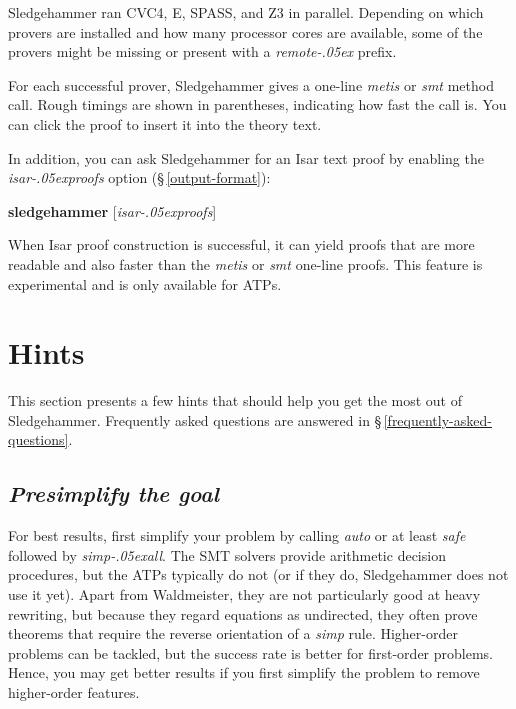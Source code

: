 \documentclass[a4paper,12pt]{article}
\let\oldS=\S
\def\S{\oldS\,}
\renewcommand\_{\hbox{\textunderscore\kern-.05ex}}
\begin{document}
Sledgehammer ran CVC4, E, SPASS, and Z3 in parallel. Depending on which
provers are installed and how many processor cores are available, some of the
provers might be missing or present with a \textit{remote\_} prefix.

For each successful prover, Sledgehammer gives a one-line \textit{metis} or
\textit{smt} method call. Rough timings are shown in parentheses, indicating how
fast the call is. You can click the proof to insert it into the theory text.

In addition, you can ask Sledgehammer for an Isar text proof by enabling the
\textit{isar\_proofs} option (\S\ref{output-format}):

\prew
\textbf{sledgehammer} [\textit{isar\_proofs}]
\postw

When Isar proof construction is successful, it can yield proofs that are more
readable and also faster than the \textit{metis} or \textit{smt} one-line
proofs. This feature is experimental and is only available for ATPs.


\section{Hints}
\label{hints}

This section presents a few hints that should help you get the most out of
Sledgehammer. Frequently asked questions are answered in
\S\ref{frequently-asked-questions}.

\newcommand\point[1]{\subsection{\emph{#1}}}


\point{Presimplify the goal}

For best results, first simplify your problem by calling \textit{auto} or at
least \textit{safe} followed by \textit{simp\_all}. The SMT solvers provide
arithmetic decision procedures, but the ATPs typically do not (or if they do,
Sledgehammer does not use it yet). Apart from Waldmeister, they are not
particularly good at heavy rewriting, but because they regard equations as
undirected, they often prove theorems that require the reverse orientation of a
\textit{simp} rule. Higher-order problems can be tackled, but the success rate
is better for first-order problems. Hence, you may get better results if you
first simplify the problem to remove higher-order features.
\end{document}
